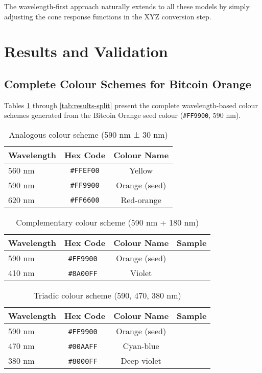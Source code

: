 \documentclass[12pt,a4paper]{article}
\newcommand{\hexcolour}[1]{%
  \definecolor{tempcolour}{HTML}{#1}%
  \texttt{\##1}~\raisebox{0.2ex}{\fboxsep=0pt\fbox{\colorbox{tempcolour}{\phantom{XX}}}}%
}
\begin{document}
The wavelength-first approach naturally extends to all these models by simply adjusting the cone response functions in the XYZ conversion step.

\section{Results and Validation}
\label{sec:results}

\subsection{Complete Colour Schemes for Bitcoin Orange}

Tables \ref{tab:results-analogous} through \ref{tab:results-split} present the complete wavelength-based colour schemes generated from the Bitcoin Orange seed colour (\texttt{\#FF9900}, 590 nm).

\begin{table}[ht]
\centering
\caption{Analogous colour scheme (590 nm ± 30 nm)}
\label{tab:results-analogous}
\begin{tabular}{lcc}
\toprule
\textbf{Wavelength} & \textbf{Hex Code} & \textbf{Colour Name} \\
\midrule
560 nm & \texttt{\#FFEF00} & Yellow \\
590 nm & \texttt{\#FF9900} & Orange (seed) \\
620 nm & \texttt{\#FF6600} & Red-orange \\
\bottomrule
\end{tabular}
\end{table}

\begin{table}[ht]
\centering
\caption{Complementary colour scheme (590 nm + 180 nm)}
\label{tab:results-complementary}
\begin{tabular}{lccc}
\toprule
\textbf{Wavelength} & \textbf{Hex Code} & \textbf{Colour Name} & \textbf{Sample} \\
\midrule
590 nm & \hexcolour{FF9900} & Orange (seed) & \cellcolor{orange590}\phantom{XX} \\
410 nm & \hexcolour{8A00FF} & Violet & \cellcolor{violet410}\phantom{XX} \\
\bottomrule
\end{tabular}
\end{table}

\begin{table}[ht]
\centering
\caption{Triadic colour scheme (590, 470, 380 nm)}
\label{tab:results-triadic}
\begin{tabular}{lccc}
\toprule
\textbf{Wavelength} & \textbf{Hex Code} & \textbf{Colour Name} & \textbf{Sample} \\
\midrule
590 nm & \hexcolour{FF9900} & Orange (seed) & \cellcolor{orange590}\phantom{XX} \\
470 nm & \hexcolour{00AAFF} & Cyan-blue & \cellcolor{blue470}\phantom{XX} \\
380 nm & \hexcolour{8000FF} & Deep violet & \cellcolor{violet410!90}\phantom{XX} \\
\bottomrule
\end{tabular}
\end{table}
\end{document}

